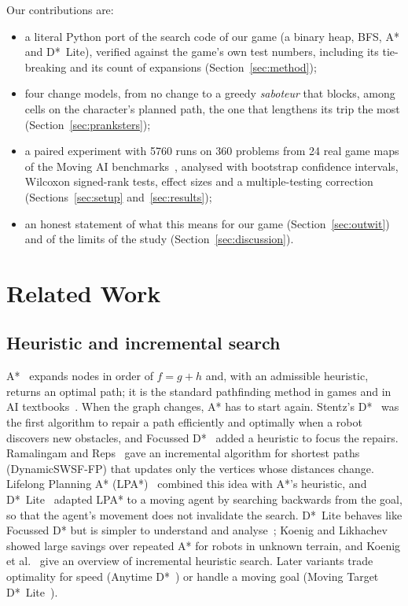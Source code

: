 \documentclass[conference,12pt]{IEEEtran}
\newcommand{\dstar}{D*~Lite}
\begin{document}
Our contributions are:
\begin{itemize}
\item a literal Python port of the search code of our game (a binary heap, BFS, A* and \dstar{}),
      verified against the game's own test numbers, including its tie-breaking and its
      count of expansions (Section~\ref{sec:method});
\item four change models, from no change to a greedy \emph{saboteur} that blocks, among cells
      on the character's planned path, the one that lengthens its trip the most
      (Section~\ref{sec:pranksters});
\item a paired experiment with 5760 runs on 360 problems from 24 real game maps of the Moving
      AI benchmarks~\cite{sturtevant2012benchmarks}, analysed with bootstrap confidence
      intervals, Wilcoxon signed-rank tests, effect sizes and a multiple-testing correction
      (Sections~\ref{sec:setup} and~\ref{sec:results});
\item an honest statement of what this means for our game (Section~\ref{sec:outwit}) and of the
      limits of the study (Section~\ref{sec:discussion}).
\end{itemize}

\section{Related Work}
\label{sec:related}

\subsection{Heuristic and incremental search}
A*~\cite{hart1968astar} expands nodes in order of $f=g+h$ and, with an admissible heuristic,
returns an optimal path; it is the standard pathfinding method in games and in AI
textbooks~\cite{russell2020aima}. When the graph changes, A* has to start again.
Stentz's D*~\cite{stentz1994dstar} was the first algorithm to repair a path efficiently and
optimally when a robot discovers new obstacles, and Focussed D*~\cite{stentz1995focussed}
added a heuristic to focus the repairs. Ramalingam and Reps~\cite{ramalingam1996incremental}
gave an incremental algorithm for shortest paths (DynamicSWSF-FP) that updates only the
vertices whose distances change. Lifelong Planning A* (LPA*)~\cite{koenig2004lpa} combined this
idea with A*'s heuristic, and \dstar{}~\cite{koenig2002dstarlite} adapted LPA* to a moving agent
by searching backwards from the goal, so that the agent's movement does not invalidate the
search. \dstar{} behaves like Focussed D* but is simpler to understand and
analyse~\cite{koenig2002dstarlite}; Koenig and Likhachev~\cite{koenig2005fast} showed large
savings over repeated A* for robots in unknown terrain, and Koenig et
al.~\cite{koenig2004incremental} give an overview of incremental heuristic search. Later
variants trade optimality for speed (Anytime D*~\cite{likhachev2005ad}) or handle a moving goal
(Moving Target \dstar{}~\cite{sun2010mtdstarlite}).
\end{document}
